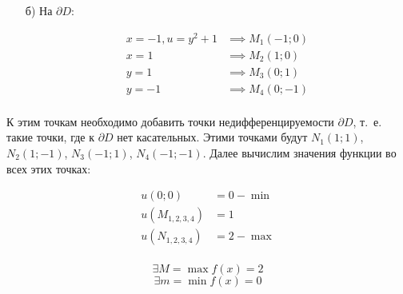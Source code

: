 \documentclass[../../main.tex]{subfiles}
\begin{document}
\begin{exmp}
\begin{enumerate}
			\item[б)] На $\partial D$:
			
			\[\begin{array}{rl}
			x = -1, u = y^2 + 1 &\implies M_1(-1; 0)\\
			x = 1 &\implies M_2(1; 0)\\
			y = 1 &\implies M_3(0; 1)\\
			y = -1 &\implies M_4(0; -1)\\
			\end{array}\]
		\end{enumerate}
			
        К этим точкам необходимо добавить точки 
        недифференцируемости $\partial D$, т.~е. такие точки, где к $
        \partial D$ нет касательных.
        Этими точками будут $N_1(1; 1)$, $N_2(1; -1)$, 
        $N_3(-1; 1)$, $N_4(-1; -1)$.
        Далее вычислим значения функции во всех этих 
        точках:
        
        \[\begin{array}{rl}
        u(0; 0) &= 0 - \min \\
        u(M_{1, 2, 3, 4}) &= 1 \\
        u(N_{1, 2, 3, 4}) &= 2 - \max \\
        \end{array}\]
        
        \[\exists M = \max f(x) = 2\]
        \[\exists m = \min f(x) = 0\]
	\end{exmp}
\end{document}
